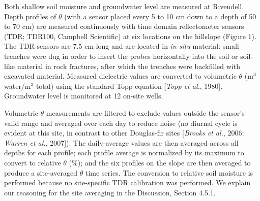 Both shallow soil moisture and groundwater level are measured at Rivendell.  Depth profiles of $\theta$ (with a sensor placed every 5 to 10 cm down to a depth of 50 to 70 cm) are measured continuously with time domain reflectometer sensors (TDR; TDR100, Campbell Scientific) at six locations on the hillslope (Figure 1).  The TDR sensors are 7.5 cm long and are located in \textit{in situ} material: small trenches were dug in order to insert the probes horizontally into the soil or soil-like material in rock fractures, after which the trenches were backfilled with excavated material.  Measured dielectric values are converted to volumetric $\theta$ (m$^3$ water/m$^3$ total) using the standard Topp equation [\textit{Topp et al.}, 1980].  Groundwater level is monitored at 12 on-site wells.

Volumetric $\theta$ measurements are filtered to exclude values outside the sensor's valid range and averaged over each day to reduce noise (no diurnal cycle is evident at this site, in contrast to other Douglas-fir sites [\textit{Brooks et al.}, 2006; \textit{Warren et al.}, 2007]).  The daily-average values are then averaged across all depths for each profile; each profile average is normalized by its maximum to convert to relative $\theta$ (\%); and the six profiles on the slope are then averaged to produce a site-averaged $\theta$ time series.  The conversion to relative soil moisture is performed because no site-specific TDR calibration was performed.  We explain our reasoning for the site averaging in the Discussion, Section 4.5.1.

